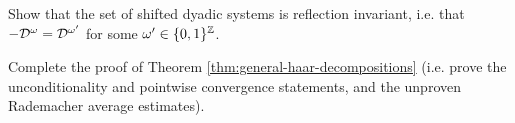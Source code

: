 \begin{exercise}\label{ex:dyadic-refln-invariance}
  Show that the set of shifted dyadic systems is reflection invariant, i.e. that $-\mathcal{D}^{\omega} = \mathcal{D}^{\omega'}$ for some $\omega' \in \{0,1\}^{\mathbb{Z}}$.
\end{exercise}

\begin{exercise}\label{ex:mgale-reduction}
  Complete the proof of Theorem \ref{thm:general-haar-decompositions} (i.e. prove the unconditionality and pointwise convergence statements, and the unproven Rademacher average estimates).
\end{exercise}




